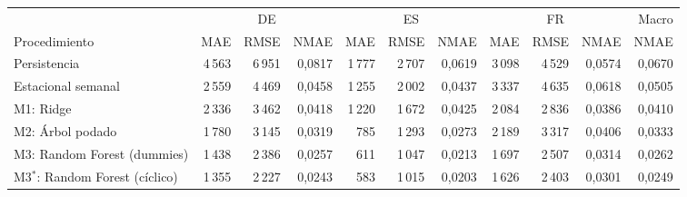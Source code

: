 \begin{tabular}{lrrrrrrrrrr}
\toprule
 & \multicolumn{3}{c}{DE} & \multicolumn{3}{c}{ES} & \multicolumn{3}{c}{FR} & Macro \\
\cmidrule(lr){2-4}\cmidrule(lr){5-7}\cmidrule(lr){8-10}
Procedimiento & MAE & RMSE & NMAE & MAE & RMSE & NMAE & MAE & RMSE & NMAE & NMAE \\
\midrule
Persistencia & 4\,563 & 6\,951 & 0{,}0817 & 1\,777 & 2\,707 & 0{,}0619 & 3\,098 & 4\,529 & 0{,}0574 & 0{,}0670 \\
\midrule
Estacional semanal & 2\,559 & 4\,469 & 0{,}0458 & 1\,255 & 2\,002 & 0{,}0437 & 3\,337 & 4\,635 & 0{,}0618 & 0{,}0505 \\
\midrule
M1: Ridge & 2\,336 & 3\,462 & 0{,}0418 & 1\,220 & 1\,672 & 0{,}0425 & 2\,084 & 2\,836 & 0{,}0386 & 0{,}0410 \\
\midrule
M2: Árbol podado & 1\,780 & 3\,145 & 0{,}0319 & 785 & 1\,293 & 0{,}0273 & 2\,189 & 3\,317 & 0{,}0406 & 0{,}0333 \\
\midrule
M3: Random Forest (dummies) & 1\,438 & 2\,386 & 0{,}0257 & 611 & 1\,047 & 0{,}0213 & 1\,697 & 2\,507 & 0{,}0314 & 0{,}0262 \\
\midrule
M3$^\ast$: Random Forest (cíclico) & 1\,355 & 2\,227 & 0{,}0243 & 583 & 1\,015 & 0{,}0203 & 1\,626 & 2\,403 & 0{,}0301 & 0{,}0249 \\
\bottomrule
\end{tabular}